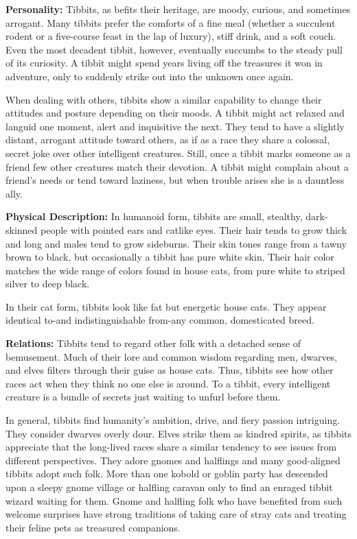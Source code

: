 \textbf{Personality:} Tibbits, as befits their heritage, are moody, curious, and sometimes arrogant. Many tibbits
prefer the comforts of a fine meal (whether a succulent rodent or a five-course feast in the lap of luxury), stiff drink, and a soft couch. Even the most decadent tibbit, however, eventually succumbs to the steady pull of its curiosity. A tibbit might spend years living off the treasures it won in adventure, only to suddenly strike out into the unknown once again. 

When dealing with others, tibbits show a similar capability to change their attitudes and posture depending on their moods. A tibbit might act relaxed and languid one moment, alert and inquisitive the next. They tend to have a slightly distant, arrogant attitude toward others, as if as a race they share a colossal, secret joke over other intelligent creatures. Still, once a tibbit marks someone as a friend few other creatures match their devotion. A tibbit might complain about a friend's needs or tend toward laziness, but when trouble arises she is a dauntless ally. 

\textbf{Physical Description:} In humanoid form, tibbits are small, stealthy, dark-skinned people with pointed ears and catlike eyes. Their hair tends to grow thick and long and males tend to grow sideburns. Their skin tones range from a tawny brown to black, but occasionally a tibbit has pure white skin. Their hair color matches the wide range of colors found in house cats, from pure white to striped silver to deep black. 

In their cat form, tibbits look like fat but energetic house cats. They appear identical to-and indistinguishable from-any common, domesticated breed. 

\textbf{Relations:} Tibbits tend to regard other folk with a detached sense of bemusement. Much of their lore and common wisdom regarding men, dwarves, and elves filters through their guise as house cats. Thus, tibbits see how other races act when they think no one else is around.
To a tibbit, every intelligent creature is a bundle of secrets just waiting to unfurl before them.

In general, tibbits find humanity's ambition, drive, and fiery passion intriguing. They consider dwarves overly dour. Elves strike them as kindred spirits, as
tibbits appreciate that the long-lived races share a similar tendency to see issues from different perspectives. They adore gnomes and halflings and many good-aligned
tibbits adopt such folk. More than one kobold or goblin party has descended upon a sleepy gnome village or halfling caravan only to find an enraged tibbit wizard waiting for them. Gnome and halfling folk who have benefited from such welcome surprises have strong traditions of taking care of stray cats and treating their feline pets as treasured companions.

